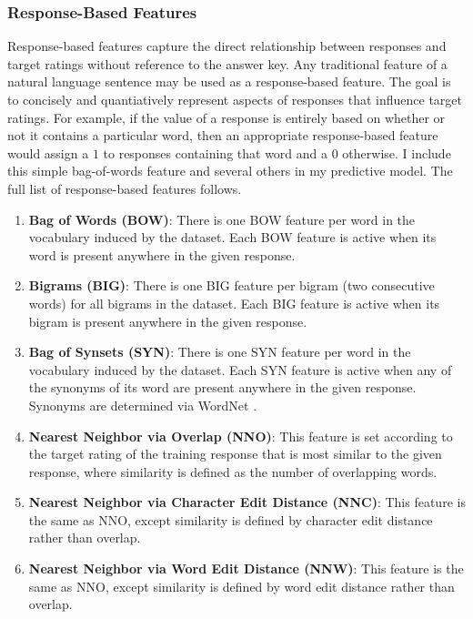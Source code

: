 \subsubsection{Response-Based Features}
Response-based features capture the direct relationship between responses and target ratings without reference to the answer key. Any traditional feature of a natural language sentence may be used as a response-based feature. The goal is to concisely and quantiatively represent aspects of responses that influence target ratings. For example, if the value of a response is entirely based on whether or not it contains a particular word, then an appropriate response-based feature would assign a $1$ to responses containing that word and a $0$ otherwise. I include this simple bag-of-words feature and several others in my predictive model. The full list of response-based features follows.

\begin{enumerate}

\item \textbf{Bag of Words (BOW)}: There is one BOW feature per word in the vocabulary induced by the dataset. Each BOW feature is active when its word is present anywhere in the given response.

\item \textbf{Bigrams (BIG)}: There is one BIG feature per bigram (two consecutive words) for all bigrams in the dataset. Each BIG feature is active when its bigram is present anywhere in the given response.

\item \textbf{Bag of Synsets (SYN)}: There is one SYN feature per word in the vocabulary induced by the dataset. 
Each SYN feature is active when any of the synonyms of its word are present anywhere in the given response. Synonyms are determined via WordNet \citep{fellbaum1998wordnet}. 

\item \textbf{Nearest Neighbor via Overlap (NNO)}: This feature is set according to the target rating of the training response that is most similar to the given response, where similarity is defined as the number of overlapping words.

\item \textbf{Nearest Neighbor via Character Edit Distance (NNC)}: This feature is the same as NNO, except similarity is defined by character edit distance rather than overlap.

\item \textbf{Nearest Neighbor via Word Edit Distance (NNW)}: This feature is the same as NNO, except similarity is defined by word edit distance rather than overlap.


\end{enumerate}

